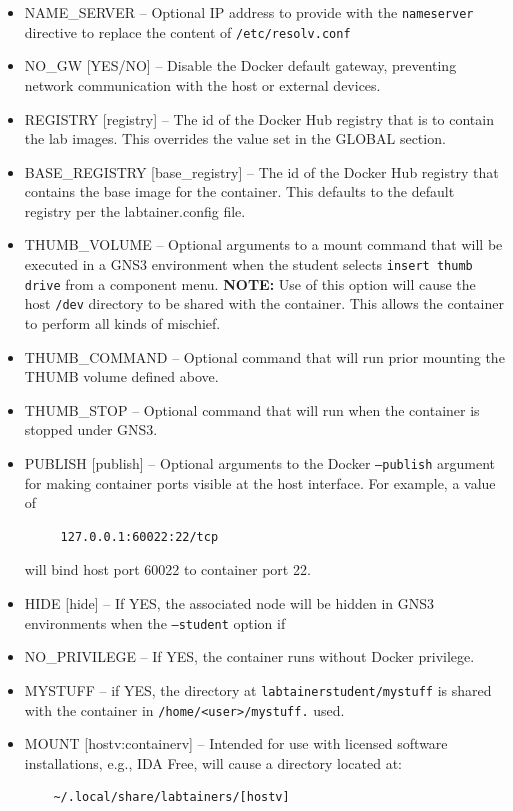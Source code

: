 \documentclass[12pt]{article}
\begin{document}
\begin{itemize}
\begin{itemize}
\item NAME\_SERVER -- Optional IP address to provide with the {\tt nameserver} directive to replace the content of {\tt /etc/resolv.conf}
\item NO\_GW [YES/NO] -- Disable the Docker default gateway, preventing network communication with the host or external devices.
\item REGISTRY [registry] -- The id of the Docker Hub registry that is to contain the lab images. This overrides the value
set in the GLOBAL section. 
\item BASE\_REGISTRY [base\_registry] -- The id of the Docker Hub registry that contains the base image for the container.  This defaults
to the default registry per the labtainer.config file.
\item THUMB\_VOLUME -- Optional arguments to a mount command that will be executed in a GNS3 environment when the student selects
{\tt insert thumb drive} from a component menu.  \textbf{NOTE:} Use of this option will cause the host {\tt /dev} directory to be shared
with the container.  This allows the container to perform all kinds of mischief.
\item THUMB\_COMMAND -- Optional command that will run prior mounting the THUMB volume defined above.
\item THUMB\_STOP -- Optional command that will run when the container is stopped under GNS3.
\item PUBLISH [publish] -- Optional arguments to the Docker {\tt --publish} argument for making container ports visible at the
host interface.  For example, a value of 
\begin{verbatim}
     127.0.0.1:60022:22/tcp
\end{verbatim}
\noindent will bind host port 60022 to container port 22.
\item HIDE [hide] -- If YES, the associated node will be hidden in GNS3 environments when the {\tt --student} option if
\item NO\_PRIVILEGE -- If YES, the container runs without Docker privilege.
\item MYSTUFF -- if YES, the directory at {\tt labtainerstudent/mystuff} is shared with the container in {\tt /home/<user>/mystuff.}
used.
\item MOUNT [hostv:containerv] -- Intended for use with licensed software installations, e.g., IDA Free, will cause a directory 
located at:
\begin{verbatim}
    ~/.local/share/labtainers/[hostv]
\end{verbatim}

\end{itemize}
\end{itemize}
\end{document}
